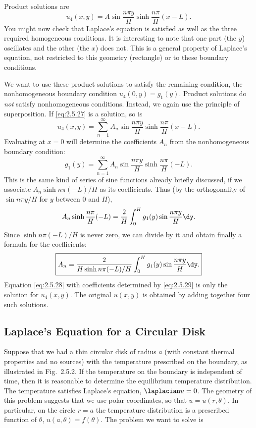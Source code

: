 Product solutions are
\begin{equation}
\label{eq:2.5.27}
u_4(x,y) = A\sin\frac{n\pi y}{H}\sinh\frac{n\pi}{H}(x-L).
\end{equation}
You might now check that Laplace's equation is satisfied as well as the three required homogeneous conditions. It is interesting to note that one part (the $y$) oscillates and the other (the $x$) does not. This is a general property of Laplace's equation, not restricted to this geometry (rectangle) or to these boundary conditions.

We want to use these product solutions to satisfy the remaining condition, the nonhomogeneous boundary condition $u_4(0,y) = g_1(y)$. Product solutions do \emph{not} satisfy nonhomogeneous conditions. Instead, we again use the principle of superposition. If \eqref{eq:2.5.27} is a solution, so is
\begin{equation}
\label{eq:2.5.28}
\boxed{u_4(x,y) = \sum_{n=1}^{\infty} A_n \sin\frac{n\pi y}{H}\sinh\frac{n\pi}{H}(x-L).}
\end{equation}
Evaluating at $x = 0$ will determine the coefficients $A_n$ from the nonhomogeneous boundary condition:
\[
g_1(y) = \sum_{n=1}^{\infty} A_n\sin\frac{n\pi y}{H}\sinh\frac{n\pi}{H}(-L).
\]
This is the same kind of series of sine functions already briefly discussed, if we associate $A_n\sinh n\pi(-L)/H$ as its coefficients. Thus (by the orthogonality of $\sin n\pi y/H$ for $y$ between $0$ and $H$),
\[
A_n\sinh\frac{n\pi}{H}(-L) = \frac{2}{H}\int_0^H g_1(y)\sin\frac{n\pi y}{H}\dy.
\]
Since $\sinh n\pi(-L)/H$ is never zero, we can divide by it and obtain finally a formula for the coefficients:
\begin{equation}
\label{eq:2.5.29}
\boxed{A_n = \frac{2}{H\sinh n\pi(-L)/H}\int_0^H g_1(y)\sin\frac{n\pi y}{H}\dy.}
\end{equation}
Equation \eqref{eq:2.5.28} with coefficients determined by \eqref{eq:2.5.29} is only the solution for $u_4(x,y)$. The original $u(x,y)$ is obtained by adding together four such solutions.

\subsection{Laplace's Equation for a Circular Disk}
\label{sec:2.5.2}

Suppose that we had a thin circular disk of radius $a$ (with constant thermal properties and no sources) with the temperature prescribed on the boundary, as illustrated in Fig.~2.5.2. If the temperature on the boundary is independent of time, then it is reasonable to determine the equilibrium temperature distribution. The temperature satisfies Laplace's equation, $\laplacian u = 0$. The geometry of this problem suggests that we use polar coordinates, so that $u = u(r,\theta)$. In particular, on the circle $r = a$ the temperature distribution is a prescribed function of $\theta$, $u(a,\theta) = f(\theta)$. The problem we want to solve is

